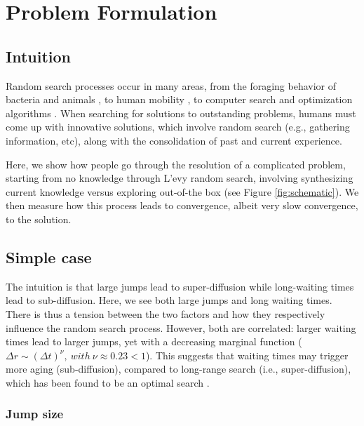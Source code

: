\section{Problem Formulation}
\subsection{Intuition}

Random search processes occur in many areas, from the foraging behavior of bacteria and animals \cite{}, to human mobility \cite{}, to computer search and optimization algorithms \cite{}.  When searching for solutions to outstanding problems, humans must come up with innovative solutions, which involve random search (e.g., gathering information, etc), along with the consolidation of past and current experience.

Here, we show how people go through the resolution of a complicated problem, starting from no knowledge through L'evy random search, involving synthesizing current knowledge versus exploring out-of-the box (see Figure \ref{fig:schematic}). We then measure how this process leads to convergence, albeit very slow convergence, to the solution.


\subsection{Simple case}

The intuition is that large jumps lead to super-diffusion while long-waiting times lead to sub-diffusion. Here, we see both large jumps and long waiting times. There is thus a tension between the two factors and how they respectively influence the random search process. However, both are correlated: larger waiting times lead to larger jumps, yet with a decreasing marginal function ($\Delta r \sim {(\Delta t)}^{\nu},~with ~\nu \approx 0.23 < 1$). This suggests that waiting times may trigger more aging (sub-diffusion), compared to long-range search (i.e., super-diffusion), which has been found to be an optimal search \cite{optimal_random_search}. 




\subsubsection{Jump size}

